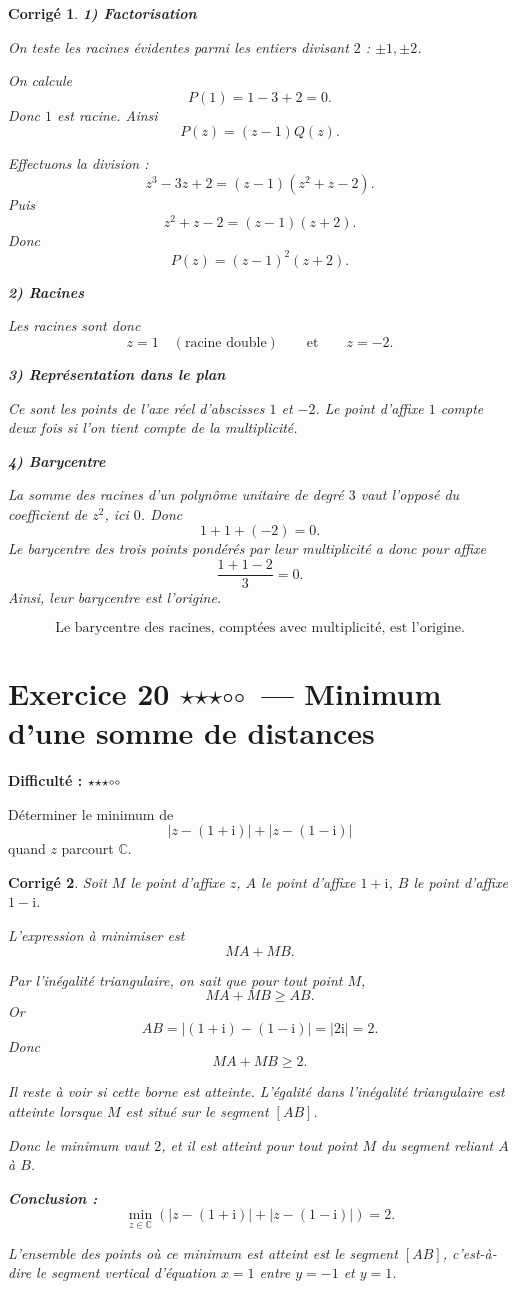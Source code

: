 \documentclass[11pt,a4paper]{article}
\newtheorem*{corrige}{Corrigé}
\newcommand{\C}{\mathbb{C}}
\newcommand{\ii}{\mathrm{i}}
\newcommand{\fullstar}{\(\star\)}
\newcommand{\emptystar}{\(\circ\)}
\newcommand{\threeStars}{\fullstar\fullstar\fullstar\emptystar\emptystar}
\newcommand{\difficulty}[1]{\textbf{Difficulté : #1}}
\begin{document}
\begin{corrige}
\textbf{1) Factorisation}

On teste les racines évidentes parmi les entiers divisant \(2\) : \(\pm 1,\pm 2\).

On calcule
\[
P(1)=1-3+2=0.
\]
Donc \(1\) est racine. Ainsi
\[
P(z)=(z-1)Q(z).
\]

Effectuons la division :
\[
z^3-3z+2=(z-1)(z^2+z-2).
\]
Puis
\[
z^2+z-2=(z-1)(z+2).
\]
Donc
\[
\boxed{P(z)=(z-1)^2(z+2)}.
\]

\textbf{2) Racines}

Les racines sont donc
\[
z=1 \quad (\text{racine double})
\qquad \text{et} \qquad
z=-2.
\]

\textbf{3) Représentation dans le plan}

Ce sont les points de l'axe réel d'abscisses \(1\) et \(-2\). Le point d'affixe \(1\) compte deux fois si l'on tient compte de la multiplicité.

\textbf{4) Barycentre}

La somme des racines d'un polynôme unitaire de degré \(3\) vaut l'opposé du coefficient de \(z^2\), ici \(0\). Donc
\[
1+1+(-2)=0.
\]
Le barycentre des trois points pondérés par leur multiplicité a donc pour affixe
\[
\frac{1+1-2}{3}=0.
\]
Ainsi, leur barycentre est l'origine.

\[
\boxed{\text{Le barycentre des racines, comptées avec multiplicité, est l'origine.}}
\]
\end{corrige}

\section{Exercice 20 \threeStars\ --- Minimum d'une somme de distances}
\difficulty{\threeStars}

Déterminer le minimum de
\[
|z-(1+\ii)|+|z-(1-\ii)|
\]
quand \(z\) parcourt \(\C\).

\begin{corrige}
Soit \(M\) le point d'affixe \(z\), \(A\) le point d'affixe \(1+\ii\), \(B\) le point d'affixe \(1-\ii\).

L'expression à minimiser est
\[
MA+MB.
\]

Par l'inégalité triangulaire, on sait que pour tout point \(M\),
\[
MA+MB \geq AB.
\]
Or
\[
AB=|(1+\ii)-(1-\ii)|=|2\ii|=2.
\]
Donc
\[
MA+MB\geq 2.
\]

Il reste à voir si cette borne est atteinte. L'égalité dans l'inégalité triangulaire est atteinte lorsque \(M\) est situé sur le segment \([AB]\).

Donc le minimum vaut \(2\), et il est atteint pour tout point \(M\) du segment reliant \(A\) à \(B\).

\textbf{Conclusion :}
\[
\boxed{\min_{z\in\C}\left(|z-(1+\ii)|+|z-(1-\ii)|\right)=2.}
\]

L'ensemble des points où ce minimum est atteint est le segment \([AB]\), c'est-à-dire le segment vertical d'équation \(x=1\) entre \(y=-1\) et \(y=1\).
\end{corrige}
\end{document}
